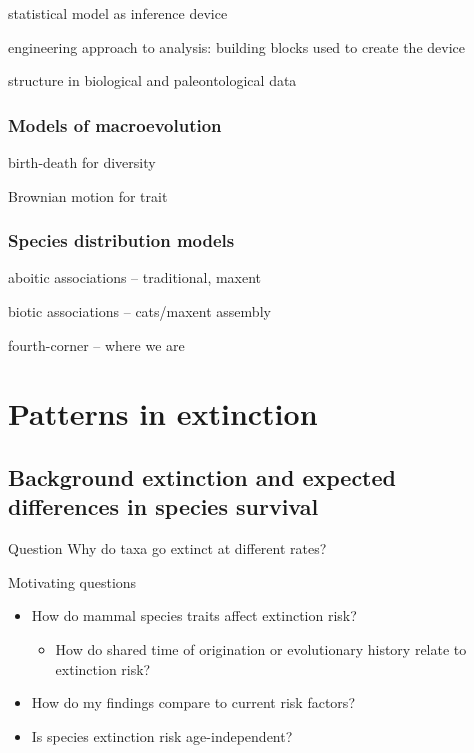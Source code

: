 \documentclass{beamer}
\begin{document}
\begin{frame}
  statistical model as inference device

  engineering approach to analysis: building blocks used to create the device
\end{frame}

\begin{frame}
  structure in biological and paleontological data
\end{frame}

\begin{frame}
  \frametitle{Models of macroevolution}
  
  birth-death for diversity

  Brownian motion for trait
\end{frame}

\begin{frame}
  \frametitle{Species distribution models}

  aboitic associations -- traditional, maxent

  biotic associations -- cats/maxent assembly

  fourth-corner -- where we are
\end{frame}




\section{Patterns in extinction}
\subsection{Background extinction and expected differences in species survival}

\begin{frame}
  \begin{alertblock}{Question}
    Why do taxa go extinct at different rates?
  \end{alertblock}
\end{frame}

\begin{frame}
  \begin{block}{Motivating questions}
    \begin{itemize}
      \item \alert{How do mammal species traits affect extinction risk?}
        \begin{itemize}
          \item \alert{How do shared time of origination or evolutionary history relate to extinction risk?}
        \end{itemize}
      \item How do my findings compare to current risk factors?
      \item Is species extinction risk age-independent?
    \end{itemize}
  \end{block}
\end{frame}
\end{document}
